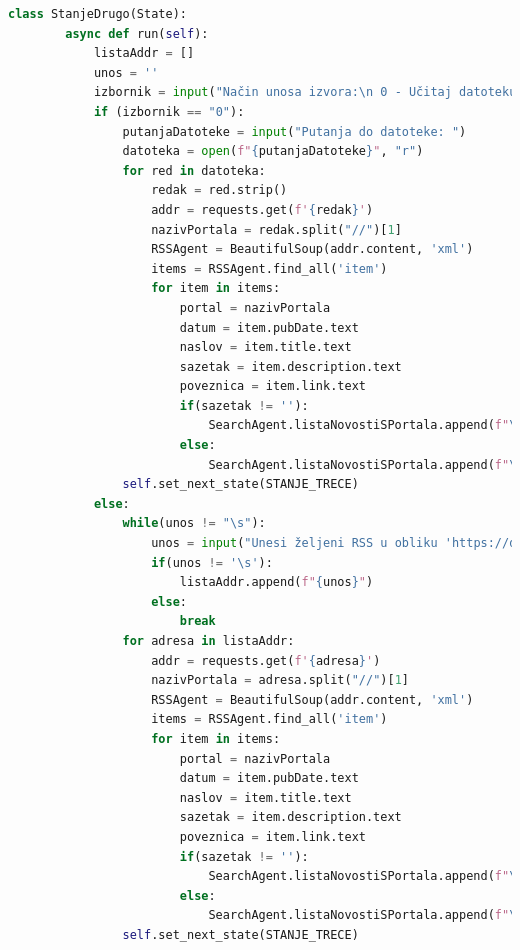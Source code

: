\documentclass[]{foi} %
\begin{document}
\begin{lstlisting}[language=Python, caption={Programski kôd za RSSAgent agenta}]
    class StanjeDrugo(State):
        async def run(self):
            listaAddr = []
            unos = ''
            izbornik = input("Način unosa izvora:\n 0 - Učitaj datoteku (.txt) s RSS izvorima [struktura datoteke: svaki izvor u svoj zaseban redak] (preporuka) \n 1 - direktan unos putem terminala (ograničeno vrijeme unosa) \n\n Vaš izbor: ")
            if (izbornik == "0"):
                putanjaDatoteke = input("Putanja do datoteke: ")
                datoteka = open(f"{putanjaDatoteke}", "r")
                for red in datoteka:
                    redak = red.strip()
                    addr = requests.get(f'{redak}')
                    nazivPortala = redak.split("//")[1]
                    RSSAgent = BeautifulSoup(addr.content, 'xml')
                    items = RSSAgent.find_all('item')
                    for item in items:
                        portal = nazivPortala
                        datum = item.pubDate.text
                        naslov = item.title.text
                        sazetak = item.description.text
                        poveznica = item.link.text
                        if(sazetak != ''):
                            SearchAgent.listaNovostiSPortala.append(f"\n\nPortal: {portal}\n\nDatum: {datum}.\n\nNaslov: {naslov}\n\nSažetak: {sazetak}\n\nPoveznica: {poveznica}\n\n--------------------------------------------------")
                        else:
                            SearchAgent.listaNovostiSPortala.append(f"\n\nPortal: {portal}\n\nDatum: {datum}.\n\nNaslov: {naslov}\n\nPoveznica: {poveznica}\n\n--------------------------------------------------")
                self.set_next_state(STANJE_TRECE)
            else:
                while(unos != "\s"):
                    unos = input("Unesi željeni RSS u obliku 'https://domain-name.xyz' (\"\\s\" - prekid unosa): ")
                    if(unos != '\s'):
                        listaAddr.append(f"{unos}")
                    else:
                        break
                for adresa in listaAddr:    
                    addr = requests.get(f'{adresa}')
                    nazivPortala = adresa.split("//")[1]
                    RSSAgent = BeautifulSoup(addr.content, 'xml')
                    items = RSSAgent.find_all('item')
                    for item in items:
                        portal = nazivPortala
                        datum = item.pubDate.text
                        naslov = item.title.text
                        sazetak = item.description.text
                        poveznica = item.link.text
                        if(sazetak != ''):
                            SearchAgent.listaNovostiSPortala.append(f"\n\nPortal: {portal}\n\nDatum: {datum}.\n\nNaslov: {naslov}\n\nSažetak: {sazetak}\n\nPoveznica: {poveznica}\n\n--------------------------------------------------")
                        else:
                            SearchAgent.listaNovostiSPortala.append(f"\n\nPortal: {portal}\n\nDatum: {datum}.\n\nNaslov: {naslov}\n\nPoveznica: {poveznica}\n\n--------------------------------------------------")
                self.set_next_state(STANJE_TRECE)
    

\end{lstlisting}
\end{document}
